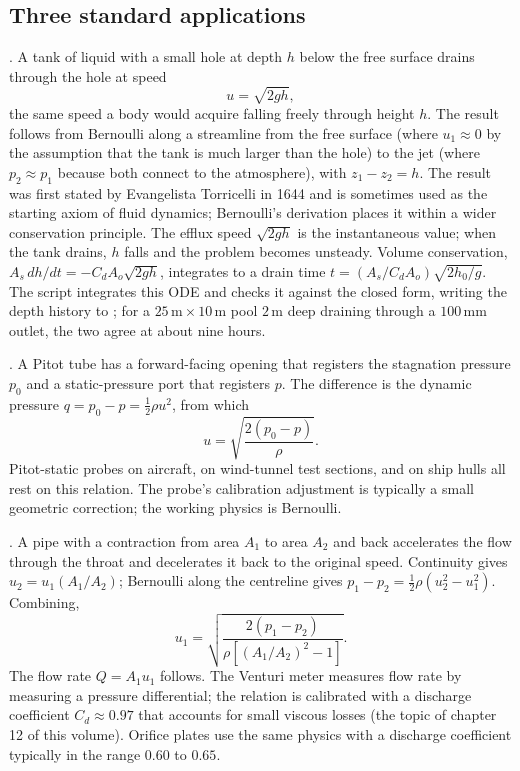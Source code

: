 \subsection{Three standard applications}

. A tank of liquid with a small hole at
depth $h$ below the free surface drains through the hole at speed
\[
u = \sqrt{2 g h},
\]
the same speed a body would acquire falling freely through height
$h$. The result follows from Bernoulli along a streamline from the
free surface (where $u_1 \approx 0$ by the assumption that the tank
is much larger than the hole) to the jet (where $p_2 \approx p_1$
because both connect to the atmosphere), with $z_1 - z_2 = h$. The
result was first stated by Evangelista Torricelli in 1644 and is
sometimes used as the starting axiom of fluid dynamics; Bernoulli's
derivation places it within a wider conservation principle. The
efflux speed $\sqrt{2gh}$ is the instantaneous value; when the tank
drains, $h$ falls and the problem becomes unsteady. Volume
conservation, $A_s\,dh/dt = -C_d A_o\sqrt{2gh}$, integrates to a drain
time $t = (A_s/C_d A_o)\sqrt{2h_0/g}$. The script
 integrates this ODE and checks it against
the closed form, writing the depth history to
; for a $25\,\si{\meter}\times
10\,\si{\meter}$ pool $2\,\si{\meter}$ deep draining through a
$100\,\si{\milli\meter}$ outlet, the two agree at about nine hours.

. A Pitot tube has a forward-facing opening
that registers the stagnation pressure $p_0$ and a static-pressure
port that registers $p$. The difference is the dynamic pressure
$q = p_0 - p = \tfrac{1}{2}\rho u^2$, from which
\[
u = \sqrt{\frac{2(p_0 - p)}{\rho}}.
\]
Pitot-static probes on aircraft, on wind-tunnel test sections, and
on ship hulls all rest on this relation. The probe's calibration
adjustment is typically a small geometric correction; the working
physics is Bernoulli.

. A pipe with a contraction from area $A_1$
to area $A_2$ and back accelerates the flow through the throat
and decelerates it back to the original speed. Continuity gives
$u_2 = u_1 (A_1/A_2)$; Bernoulli along the centreline gives
$p_1 - p_2 = \tfrac{1}{2}\rho(u_2^2 - u_1^2)$. Combining,
\[
u_1 = \sqrt{\frac{2(p_1 - p_2)}{\rho [(A_1/A_2)^2 - 1]}}.
\]
The flow rate $Q = A_1 u_1$ follows. The Venturi meter measures
flow rate by measuring a pressure differential; the relation is
calibrated with a discharge coefficient $C_d \approx 0.97$ that
accounts for small viscous losses (the topic of chapter 12 of this
volume). Orifice plates use the same physics with a discharge
coefficient typically in the range $0.60$ to $0.65$.

